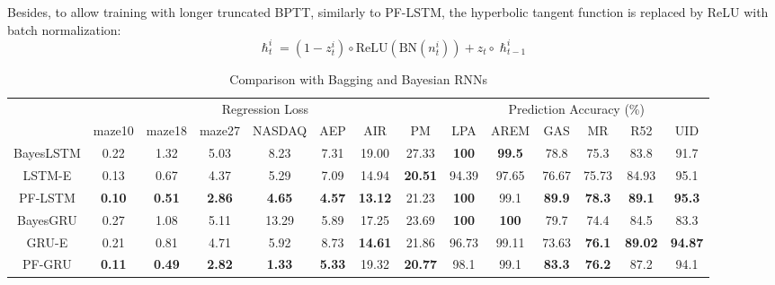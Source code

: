 \documentclass[letterpaper]{article} %
\begin{document}
Besides, to allow training with longer truncated BPTT, similarly to PF-LSTM, the hyperbolic tangent function is replaced by ReLU with batch normalization:
\begin{equation}
\hslash_t^i = (1-z_t^i)\circ \mathrm{ReLU}(\mathrm{BN}(n_t^i)) + z_t\circ \hslash_{t-1}^i
\end{equation}
\begin{table}[t]
	\centering
	\fontsize{8}{9}\selectfont
	\caption{Comparison with Bagging and Bayesian RNNs}
	\label{tab:ens_bayes}
	\begin{tabular}{cccccccccccccc}
		\toprule
		& \multicolumn{7}{c}{Regression Loss}                                                                             & \multicolumn{6}{c}{Prediction Accuracy (\%)}\\
		& maze10        & maze18        & maze27        & NASDAQ        & AEP           & AIR            & PM             & LPA          & AREM          & GAS           & MR            & R52            & UID            \\
						\cmidrule(lr){0-7}\cmidrule(lr){9-14}
		BayesLSTM & 0.22          & 1.32          & 5.03          & 8.23          & 7.31          & 19.00          & 27.33          & \textbf{100} & \textbf{99.5} & 78.8          & 75.3          & 83.8           & 91.7           \\
		LSTM-E    & 0.13          & 0.67          & 4.37          & 5.29          & 7.09          & 14.94          & \textbf{20.51} & 94.39        & 97.65         & 76.67         & 75.73         & 84.93          & 95.1           \\
		PF-LSTM   & \textbf{0.10} & \textbf{0.51} & \textbf{2.86} & \textbf{4.65} & \textbf{4.57} & \textbf{13.12} & 21.23          & \textbf{100} & 99.1          & \textbf{89.9} & \textbf{78.3} & \textbf{89.1}  & \textbf{95.3}  \\
		\midrule
		BayesGRU  & 0.27          & 1.08          & 5.11          & 13.29         & 5.89          & 17.25          & 23.69          & \textbf{100} & \textbf{100}  & 79.7          & 74.4          & 84.5           & 83.3           \\
		GRU-E     & 0.21          & 0.81          & 4.71          & 5.92          & 8.73          & \textbf{14.61} & 21.86          & 96.73        & 99.11         & 73.63         & \textbf{76.1} & \textbf{89.02} & \textbf{94.87} \\
		PF-GRU    & \textbf{0.11} & \textbf{0.49} & \textbf{2.82} & \textbf{1.33} & \textbf{5.33} & 19.32          & \textbf{20.77} & 98.1         & 99.1          & \textbf{83.3} & \textbf{76.2} & 87.2           & 94.1          \\
		\bottomrule
	\end{tabular}
\end{table}
\end{document}
